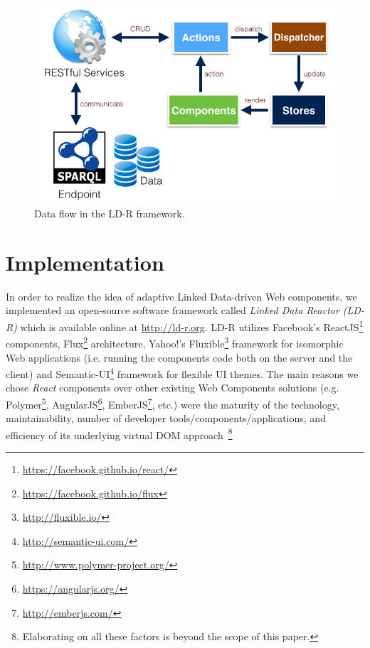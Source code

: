 \documentclass{acm_proc_article-sp}
\begin{document}
\begin{figure}[tb]
  \includegraphics[width=.9\linewidth]{images/dataflow.jpg}
  \caption{Data flow in the LD-R framework.}
  \label{fig:dataflow}
\end{figure}

\section{Implementation}

In order to realize the idea of adaptive Linked Data-driven Web components, we implemented an open-source software framework called \emph{Linked Data Reactor (LD-R)} which is available online at \url{http://ld-r.org}.
LD-R utilizes Facebook's ReactJS\footnote{\url{https://facebook.github.io/react/}} components, Flux\footnote{\url{https://facebook.github.io/flux}} architecture, Yahoo!'s Fluxible\footnote{\url{http://fluxible.io/}} framework for isomorphic Web applications (i.e. running the components code both on the server and the client) and Semantic-UI\footnote{\url{http://semantic-ui.com/}} framework for flexible UI themes.
The main reasons we chose \emph{React} components over other existing Web Components solutions (e.g. Polymer\footnote{\url{http://www.polymer-project.org/}}, AngularJS\footnote{\url{https://angularjs.org/}}, EmberJS\footnote{\url{http://emberjs.com/}}, etc.) were the maturity of the technology, maintainability, number of developer tools/components/applications, and efficiency of its underlying virtual DOM approach~\footnote{Elaborating on all these factors is beyond the scope of this paper.}
\end{document}
